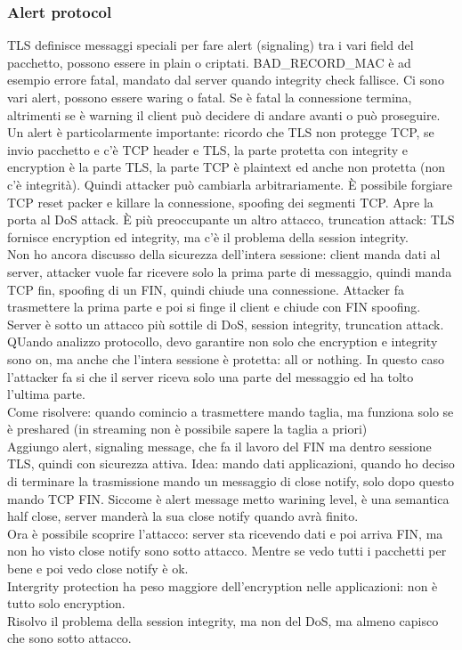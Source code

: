 \documentclass[16px]{article}
\begin{document}
\subsubsection{Alert protocol}
TLS definisce messaggi speciali per fare alert (signaling) tra i vari field del pacchetto, possono essere in plain o criptati. BAD\_RECORD\_MAC è ad esempio errore fatal, mandato dal server quando integrity check fallisce. Ci sono vari alert, possono essere waring o fatal. Se è fatal la connessione termina, altrimenti se è warning il client può decidere di andare avanti o può proseguire.\\ Un alert è particolarmente importante: ricordo che TLS non protegge TCP, se invio pacchetto e c'è TCP header e TLS, la parte protetta con integrity e encryption è la parte TLS, la parte TCP è plaintext ed anche non protetta (non c'è integrità). Quindi attacker può cambiarla arbitrariamente. È possibile forgiare TCP reset packer e killare la connessione, spoofing dei segmenti TCP. Apre la porta al DoS attack. È più preoccupante un altro attacco, truncation attack: TLS fornisce encryption ed integrity, ma c'è il problema della session integrity.\\ Non ho ancora discusso della sicurezza dell'intera sessione: client manda dati al server, attacker vuole far ricevere solo la prima parte di messaggio, quindi manda TCP fin, spoofing di un FIN, quindi chiude una connessione. Attacker fa trasmettere la prima parte e poi si finge il client e chiude con FIN spoofing. Server è sotto un attacco più sottile di DoS, session integrity, truncation attack. QUando analizzo protocollo, devo garantire non solo che encryption e integrity sono on, ma anche che l'intera sessione è protetta: all or nothing. In questo caso l'attacker fa si che il server riceva solo una parte del messaggio ed ha tolto l'ultima parte.\\ Come risolvere: quando comincio a trasmettere mando taglia, ma funziona solo se è preshared (in streaming non è possibile sapere la taglia a priori)\\ Aggiungo alert, signaling message, che fa il lavoro del FIN ma dentro sessione TLS, quindi con sicurezza attiva. Idea: mando dati applicazioni, quando ho deciso di terminare la trasmissione mando un messaggio di close notify, solo dopo questo mando TCP FIN. Siccome è alert message metto warining level, è una semantica half close, server manderà la sua close notify quando avrà finito.\\ Ora è possibile scoprire l'attacco: server sta ricevendo dati e poi arriva FIN, ma non ho visto close notify sono sotto attacco. Mentre se vedo tutti i pacchetti per bene e poi vedo close notify è ok.\\ Intergrity protection ha peso maggiore dell'encryption nelle applicazioni: non è tutto solo encryption.\\ Risolvo il problema della session integrity, ma non del DoS, ma almeno capisco che sono sotto attacco.
\end{document}
